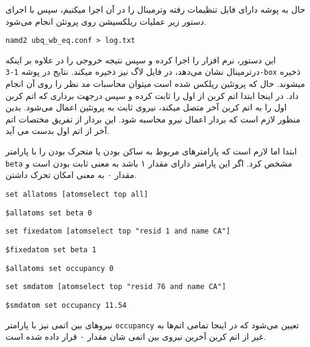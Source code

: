 حال به پوشه دارای فایل تنظیمات رفته و‌ترمینال را در آن اجرا میکنیم،
 سپس با اجرای دستور زیر عملیات ریلکسیشن روی پروتئن انجام می‌شود.
\begin{latin}
	\verb|namd2 ubq_wb_eq.conf > log.txt|
\end{latin}
این دستور، نرم افزار  را اجرا کرده و سپس نتیجه خروجی را در علاوه بر اینکه در‌ترمینال نشان می‌دهد، در فایل لاگ نیز ذخیره میکند.
نتایج در پوشه \verb|1-3-box| ذخیره میشوند.
حال که پروتئین ریلکس شده است میتوان محاسبات مد نظر را روی آن انجام داد. در اینجا ابتدا اتم کربن از  اول را ثابت کرده و سپس درجهت برداری که اتم کربن  اول را به اتم کربن  آخر متصل میکند، نیروی ثابت به پروتئین اعمال می‌شود. بدین منظور لازم است که بردار اعمال نیرو محاسبه شود. این بردار از تفریق مختصات اتم آخر از اتم اول بدست می آید.

ابتدا اما لازم است که پارامتر‌‌های مربوط به ساکن بودن یا متحرک بودن  را با پارامتر \verb*|beta| مشخص کرد. اگر این پارامتر دارای مقدار ۱ باشد به معنی ثابت بودن است و مقدار ۰ به معنی امکان تحرک داشتن.
\begin{latin}
	\verb|set allatoms [atomselect top all]|
	
	\verb|$allatoms set beta 0|
	
	\verb|set fixedatom [atomselect top "resid 1 and name CA"]|
	
	\verb|$fixedatom set beta 1|

	\verb|$allatoms set occupancy 0|
	
	\verb|set smdatom [atomselect top "resid 76 and name CA"]|
	
	\verb|$smdatom set occupancy 11.54|
\end{latin}
 نیرو‌‌های بین اتمی نیز با پارامتر \verb*|occupancy| تعیین می‌شود که در اینجا تمامی اتم‌ها به غیر از اتم کربن آخرین  نیروی بین اتمی شان مقدار ۰ قرار داده شده است.
 
